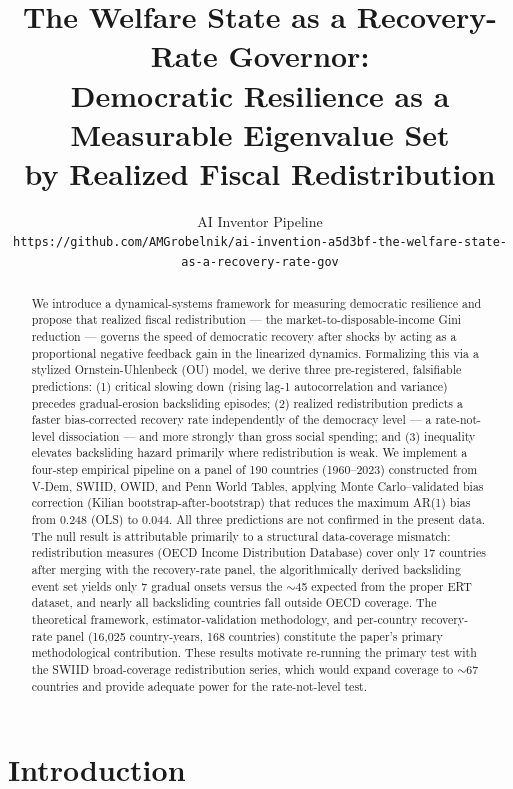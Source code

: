 \documentclass[11pt,letterpaper]{article}
\title{The Welfare State as a Recovery-Rate Governor:\\
Democratic Resilience as a Measurable Eigenvalue Set\\
by Realized Fiscal Redistribution}
\author{%
  AI Inventor Pipeline\\
  \texttt{https://github.com/AMGrobelnik/ai-invention-a5d3bf-the-welfare-state-as-a-recovery-rate-gov}
}
\date{}
\begin{document}
\maketitle

\begin{abstract}
We introduce a dynamical-systems framework for measuring democratic resilience and propose that realized fiscal redistribution
--- the market-to-disposable-income Gini reduction --- governs the speed of democratic recovery after shocks by acting as a
proportional negative feedback gain in the linearized dynamics. Formalizing this via a stylized Ornstein-Uhlenbeck (OU)
model, we derive three pre-registered, falsifiable predictions: (1) critical slowing down (rising lag-1 autocorrelation
and variance) precedes gradual-erosion backsliding episodes; (2) realized redistribution predicts a faster bias-corrected
recovery rate independently of the democracy level --- a rate-not-level dissociation --- and more strongly than gross social
spending; and (3) inequality elevates backsliding hazard primarily where redistribution is weak. We implement a four-step
empirical pipeline on a panel of 190 countries (1960--2023) constructed from V-Dem, SWIID, OWID, and Penn World Tables, applying
Monte Carlo--validated bias correction (Kilian bootstrap-after-bootstrap) that reduces the maximum AR(1) bias from 0.248
(OLS) to 0.044. All three predictions are not confirmed in the present data. The null result is attributable primarily to
a structural data-coverage mismatch: redistribution measures (OECD Income Distribution Database) cover only 17 countries
after merging with the recovery-rate panel, the algorithmically derived backsliding event set yields only 7 gradual onsets
versus the $\sim$45 expected from the proper ERT dataset, and nearly all backsliding countries fall outside OECD coverage. The
theoretical framework, estimator-validation methodology, and per-country recovery-rate panel (16,025 country-years, 168
countries) constitute the paper's primary methodological contribution. These results motivate re-running the primary test
with the SWIID broad-coverage redistribution series, which would expand coverage to $\sim$67 countries and provide adequate power
for the rate-not-level test.
\end{abstract}

\section{Introduction}
\end{document}
